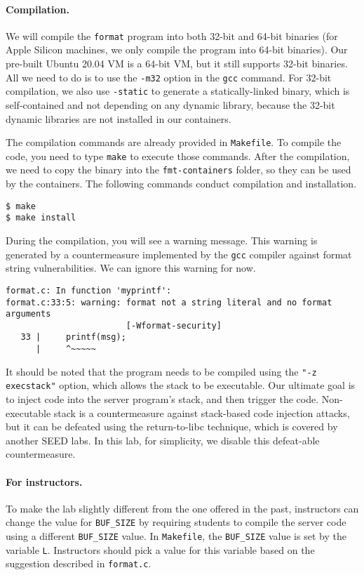 \paragraph{Compilation.} 
We will compile the \texttt{format} program into both 32-bit and 64-bit
binaries (for Apple Silicon machines, we only compile the program
into 64-bit binaries). Our pre-built Ubuntu 20.04 VM is a 64-bit VM, but it
still supports 32-bit binaries. All we need to do is to
use the \texttt{-m32} option in the \texttt{gcc} command.
For 32-bit compilation, we also use \texttt{-static} to generate
a statically-linked binary, which is self-contained and not depending
on any dynamic library, because the 32-bit dynamic libraries
are not installed in our containers.

The compilation commands are already provided in \texttt{Makefile}. To compile
the code, you need to type \texttt{make} to execute those commands.
After the compilation, we need to copy the binary into
the \texttt{fmt-containers} folder, so they can be used by the
containers. The following commands conduct compilation and
installation.

\begin{lstlisting}
$ make
$ make install
\end{lstlisting}


During the compilation, you will see a
warning message. This warning is generated by a countermeasure implemented by
the \texttt{gcc} compiler against format string vulnerabilities. We can
ignore this warning for now. 

\begin{lstlisting}
format.c: In function 'myprintf':
format.c:33:5: warning: format not a string literal and no format arguments
                        [-Wformat-security]
   33 |     printf(msg);
      |     ^~~~~~
\end{lstlisting}

It should be noted that the program needs to be compiled using 
the \texttt{"-z execstack"} option, which allows the stack to be 
executable. Our ultimate goal is to inject code into the 
server program's stack, and then trigger the code. 
Non-executable stack is a countermeasure against stack-based 
code injection attacks, but 
it can be defeated using the return-to-libc technique, which 
is covered by another SEED labs. In this lab, for simplicity,
we disable this defeat-able countermeasure. 


\paragraph{For instructors.} 
To make the lab slightly different from the one offered in the past,
instructors can change the value for \texttt{BUF\_SIZE} by requiring
students to compile the server code using a different \texttt{BUF\_SIZE} value.
In \texttt{Makefile}, the \texttt{BUF\_SIZE} value is set by
the variable \texttt{L}. Instructors should pick a value for 
this variable based on the suggestion described in \texttt{format.c}.



